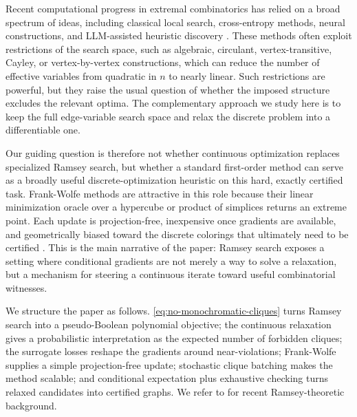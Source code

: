 \documentclass{article}
\begin{document}
Recent computational progress in extremal combinatorics has relied on a broad spectrum of ideas, including classical local search, cross-entropy methods, neural constructions, and LLM-assisted heuristic discovery \cite{Rubinstein2004,wagner2021constructions,nagda2026reinforcedgenerationcombinatorialstructures}. These methods often exploit restrictions of the search space, such as algebraic, circulant, vertex-transitive, Cayley, or vertex-by-vertex constructions, which can reduce the number of effective variables from quadratic in $n$ to nearly linear. Such restrictions are powerful, but they raise the usual question of whether the imposed structure excludes the relevant optima. The complementary approach we study here is to keep the full edge-variable search space and relax the discrete problem into a differentiable one.

Our guiding question is therefore not whether continuous optimization replaces specialized Ramsey search, but whether a standard first-order method can serve as a broadly useful discrete-optimization heuristic on this hard, exactly certified task. Frank-Wolfe methods are attractive in this role because their linear minimization oracle over a hypercube or product of simplices returns an extreme point. Each update is projection-free, inexpensive once gradients are available, and geometrically biased toward the discrete colorings that ultimately need to be certified \cite{frank1956algorithm,braun2022conditional}. This is the main narrative of the paper: Ramsey search exposes a setting where conditional gradients are not merely a way to solve a relaxation, but a mechanism for steering a continuous iterate toward useful combinatorial witnesses.

We structure the paper as follows. \cref{eq:no-monochromatic-cliques} turns Ramsey search into a pseudo-Boolean polynomial objective; the continuous relaxation gives a probabilistic interpretation as the expected number of forbidden cliques; the surrogate losses reshape the gradients around near-violations; Frank-Wolfe supplies a simple projection-free update; stochastic clique batching makes the method scalable; and conditional expectation plus exhaustive checking turns relaxed candidates into certified graphs. We refer to \cite{morris2026recentresultsramseytheory} for recent Ramsey-theoretic background.
\end{document}
